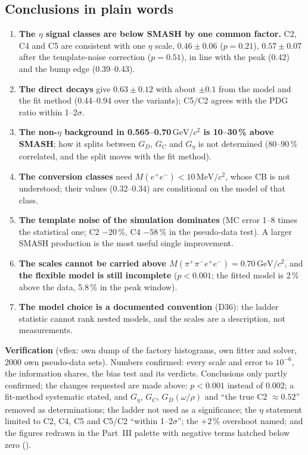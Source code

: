\documentclass[11pt,a4paper]{article}
\newcommand{\Mfour}{\ensuremath{M(\pi^{+}\pi^{-}e^{+}e^{-})}\xspace}
\newcommand{\Mee}{\ensuremath{M(e^{+}e^{-})}\xspace}
\newcommand{\GeVcc}{\ensuremath{\mathrm{GeV}/c^{2}}\xspace}
\newcommand{\MeVcc}{\ensuremath{\mathrm{MeV}/c^{2}}\xspace}
\newcommand{\code}[1]{\texttt{\detokenize{#1}}}
\newcommand{\Geta}{\ensuremath{G_\eta}\xspace}
\begin{document}
\subsection{Conclusions in plain words}
\label{sec:flex-concl}
\begin{enumerate}\setlength{\itemsep}{1pt}
\item \textbf{The $\eta$ signal classes are below SMASH by one common factor.} C2, C4 and C5 are consistent with one $\eta$ scale,
      $0.46\pm0.06$ ($p=0.21$), $0.57\pm0.07$ after the template-noise correction ($p=0.51$), in line with the peak (0.42) and the bump edge
      (0.39--0.43).
\item \textbf{The direct decays} give $0.63\pm0.12$ with about $\pm0.1$ from the model and the fit method (0.44--0.94 over the variants); C5/C2 agrees
      with the PDG ratio within 1--2$\sigma$.
\item \textbf{The non-$\eta$ background in 0.565--0.70\,\GeVcc is 10--30\,\% above SMASH}; how it splits between $G_D$, $G_C$ and \Geta is not
      determined (80--90\,\% correlated, and the split moves with the fit method).
\item \textbf{The conversion classes} need \Mee$<10$\,\MeVcc, whose CB is not understood; their values (0.32--0.34) are conditional on the model of
      that class.
\item \textbf{The template noise of the simulation dominates} (MC error 1--8 times the statistical one; C2 $-20$\,\%, C4 $-58$\,\% in the pseudo-data
      test). A larger SMASH production is the most useful single improvement.
\item \textbf{The scales cannot be carried above \Mfour$=0.70$\,\GeVcc}, and \textbf{the flexible model is still incomplete} ($p<0.001$; the fitted
      model is 2\,\% above the data, 5.8\,\% in the peak window).
\item \textbf{The model choice is a documented convention} (D36): the ladder statistic cannot rank nested models, and the scales are a description,
      not measurements.
\end{enumerate}

\textbf{Verification} (vflex: own dump of the factory histograms, own fitter and solver, 2000 own pseudo-data sets). Numbers confirmed: every
scale and error to $10^{-6}$, the information shares, the bias test and its verdicts. Conclusions only partly confirmed; the changes requested
are made above: $p<0.001$ instead of 0.002; a fit-method systematic stated, and \Geta, $G_C$, $G_D(\omega/\rho)$ and ``the true C2 $\approx0.52$''
removed as determinations; the ladder not used as a significance; the $\eta$ statement limited to C2, C4, C5 and C5/C2 ``within 1--2$\sigma$'';
the $+2$\,\% overshoot named; and the figures redrawn in the Part~III palette with negative terms hatched below zero (\code{flex_figs_v2.C}).
\end{document}
